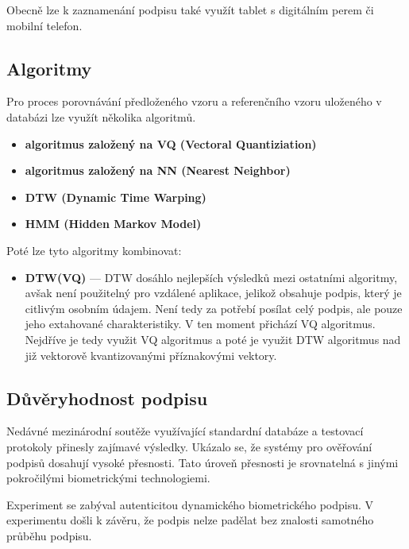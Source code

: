 Obecně lze k zaznamenání podpisu také využít tablet s digitálním perem či mobilní telefon.

\subsection*{Algoritmy}
Pro proces porovnávání předloženého vzoru a referenčního vzoru uloženého v databázi lze využít několika algoritmů.

\begin{itemize}
  \item \textbf{algoritmus založený na VQ (Vectoral Quantiziation)}
  \item \textbf{algoritmus založený na NN (Nearest Neighbor)}
  \item \textbf{DTW (Dynamic Time Warping)}
  \item \textbf{HMM (Hidden Markov Model)}
\end{itemize}
\noindent
Poté lze tyto algoritmy kombinovat:
\begin{itemize}
  \item \textbf{DTW(VQ)} --- DTW dosáhlo nejlepších výsledků mezi ostatními algoritmy, avšak není použitelný pro vzdálené aplikace, jelikož obsahuje podpis, který je citlivým osobním údajem.
  Není tedy za potřebí posílat celý podpis, ale pouze jeho extahované charakteristiky.
  V ten moment přichází VQ algoritmus. Nejdříve je tedy využit VQ algoritmus a poté je využit DTW algoritmus nad již vektorově kvantizovanými příznakovými vektory.~\cite{Jain2006}
\end{itemize}

\subsection*{Důvěryhodnost podpisu}
Nedávné mezinárodní soutěže využívající standardní databáze a testovací protokoly přinesly zajímavé výsledky.   %
Ukázalo se, že systémy pro ověřování podpisů dosahují vysoké přesnosti.                                         %
Tato úroveň přesnosti je srovnatelná s jinými pokročilými biometrickými technologiemi.~\cite{Impedovo2008}      %

Experiment se zabýval autenticitou dynamického biometrického podpisu.
V experimentu došli k závěru, že podpis nelze padělat bez znalosti samotného průběhu podpisu.~\cite{6986974} %

